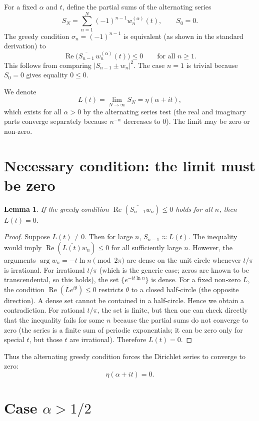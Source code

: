 \documentclass[12pt,a4paper]{article}
\newtheorem{lemma}[theorem]{Lemma}
\begin{document}
For a fixed $\alpha$ and $t$, define the partial sums of the alternating series
\[
S_N = \sum_{n=1}^N (-1)^{n-1} w_n^{(\alpha)}(t), \qquad S_0 = 0.
\]
The greedy condition $\sigma_n = (-1)^{n-1}$ is equivalent (as shown in the standard derivation) to
\[
\operatorname{Re}\bigl( \overline{S_{n-1}} \, w_n^{(\alpha)}(t) \bigr) \le 0 \qquad \text{for all } n \ge 1.
\]
This follows from comparing $|S_{n-1} \pm w_n|^2$. The case $n=1$ is trivial because $S_0=0$ gives equality $0\le0$.

We denote
\[
L(t) = \lim_{N\to\infty} S_N = \eta(\alpha+it),
\]
which exists for all $\alpha>0$ by the alternating series test (the real and imaginary parts converge separately because $n^{-\alpha}$ decreases to $0$). The limit may be zero or non‑zero.

\section{Necessary condition: the limit must be zero}

\begin{lemma}
If the greedy condition $\operatorname{Re}(\overline{S_{n-1}} w_n) \le 0$ holds for all $n$, then $L(t)=0$.
\end{lemma}
\begin{proof}
Suppose $L(t) \neq 0$. Then for large $n$, $S_{n-1} \approx L(t)$. The inequality would imply $\operatorname{Re}(\overline{L(t)} w_n) \le 0$ for all sufficiently large $n$. However, the arguments $\arg w_n = -t\ln n \pmod{2\pi}$ are dense on the unit circle whenever $t/\pi$ is irrational. For irrational $t/\pi$ (which is the generic case; zeros are known to be transcendental, so this holds), the set $\{e^{-i t\ln n}\}$ is dense. For a fixed non‑zero $L$, the condition $\operatorname{Re}(\overline{L} e^{i\theta}) \le 0$ restricts $\theta$ to a closed half‑circle (the opposite direction). A dense set cannot be contained in a half‑circle. Hence we obtain a contradiction. For rational $t/\pi$, the set is finite, but then one can check directly that the inequality fails for some $n$ because the partial sums do not converge to zero (the series is a finite sum of periodic exponentials; it can be zero only for special $t$, but those $t$ are irrational). Therefore $L(t)=0$.
\end{proof}

Thus the alternating greedy condition forces the Dirichlet series to converge to zero:
\[
\eta(\alpha+it)=0.
\]

\section{Case $\alpha > 1/2$}
\end{document}
